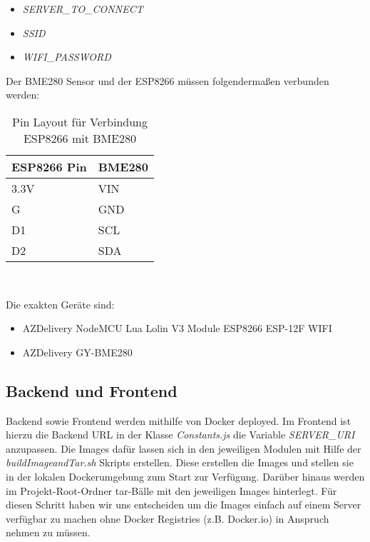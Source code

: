 \begin{itemize}
	\item \textit{SERVER\_TO\_CONNECT}
	\item \textit{SSID}
	\item \textit{WIFI\_PASSWORD}
\end{itemize}

Der BME280 Sensor und der ESP8266 müssen folgendermaßen verbunden werden:

\begin{table}[hbt]
	\centering
	\begin{minipage}[t]{.5\textwidth}
		\caption{Pin Layout für Verbindung ESP8266 mit BME280} 
	\begin{tabular}{|l|l|}
		\hline
		\textbf{ESP8266 Pin}	& \textbf{BME280}  \\
		\hline
		3.3V & VIN \\
		\hline
		G & GND \\
		\hline
		D1 & SCL \\
		\hline
		D2 & SDA \\
		\hline
	\end{tabular}
	\\
\label{tab:espBmePinout}
\end{minipage}
\end{table}

Die exakten Geräte sind:

\begin{itemize}
    \item AZDelivery NodeMCU Lua Lolin V3 Module ESP8266 ESP-12F WIFI
    \item AZDelivery GY-BME280
\end{itemize}

\subsection{Backend und Frontend}

Backend sowie Frontend werden mithilfe von Docker deployed.
Im Frontend ist hierzu die Backend URL in der Klasse \textit{Constants.js} die Variable \textit{SERVER\_URI} anzupassen.
Die Images dafür lassen sich in den jeweiligen Modulen mit Hilfe der \textit{buildImageandTar.sh} Skripts erstellen.
Diese erstellen die Images und stellen sie in der lokalen Dockerumgebung zum Start zur Verfügung.
Darüber hinaus werden im Projekt-Root-Ordner tar-Bälle mit den jeweiligen Images hinterlegt.
Für diesen Schritt haben wir uns entscheiden um die Images einfach auf einem Server verfügbar zu machen ohne Docker Registries (z.B. Docker.io) in Anspruch nehmen zu müssen.

